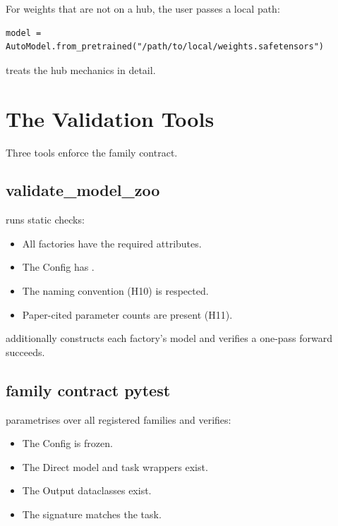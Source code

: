 For weights that are not on a hub, the user passes a local path:

\begin{lstlisting}[style=lucid,language=LucidPython]
model = AutoModel.from_pretrained("/path/to/local/weights.safetensors")
\end{lstlisting}

 treats the hub mechanics in detail.

\section{The Validation Tools}
\label{sec:zoo_architecture:validation}

Three tools enforce the family contract.

\subsection{validate\_model\_zoo}
\label{ssec:zoo_architecture:validate}

runs static checks:
\begin{itemize}
  \item All factories have the required 
    attributes.
  \item The Config has .
  \item The naming convention (H10) is respected.
  \item Paper-cited parameter counts are present (H11).
\end{itemize}

 additionally constructs each factory's model
and verifies a one-pass forward succeeds.

\subsection{family contract pytest}
\label{ssec:zoo_architecture:family_pytest}

parametrises over all registered families and verifies:
\begin{itemize}
  \item The Config is frozen.
  \item The Direct model and task wrappers exist.
  \item The Output dataclasses exist.
  \item The  signature matches the task.
\end{itemize}

